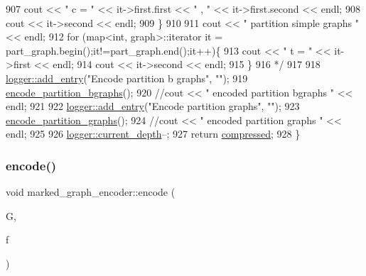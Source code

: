 \begin{DoxyCode}
907 \textcolor{comment}{    cout << " c = " << it->first.first << " , " << it->first.second << endl;}
908 \textcolor{comment}{    cout << it->second << endl;}
909 \textcolor{comment}{  \}}
910 \textcolor{comment}{}
911 \textcolor{comment}{  cout << " partition simple graphs " << endl;}
912 \textcolor{comment}{  for (map<int, graph>::iterator it = part\_graph.begin();it!=part\_graph.end();it++)\{}
913 \textcolor{comment}{    cout << " t = " << it->first << endl;}
914 \textcolor{comment}{    cout << it->second << endl;}
915 \textcolor{comment}{  \}}
916 \textcolor{comment}{  */}
917 
918   \hyperlink{classlogger_a710163deb17bc81f70d53d285b8ac9ac}{logger::add\_entry}(\textcolor{stringliteral}{"Encode partition b graphs"}, \textcolor{stringliteral}{""});
919   \hyperlink{classmarked__graph__encoder_aa113c4870e3221faa332b2151b63d9e6}{encode\_partition\_bgraphs}();
920   \textcolor{comment}{//cout << " encoded partition bgraphs " << endl;}
921 
922   \hyperlink{classlogger_a710163deb17bc81f70d53d285b8ac9ac}{logger::add\_entry}(\textcolor{stringliteral}{"Encode partition graphs"}, \textcolor{stringliteral}{""});
923   \hyperlink{classmarked__graph__encoder_a654463d4b256b84225f5944b5e361ebf}{encode\_partition\_graphs}();
924   \textcolor{comment}{//cout << " encoded partition graphs " << endl;}
925   
926   \hyperlink{classlogger_a9d29b49bd318a719a8e85b59eac54fe0}{logger::current\_depth}--;
927   \textcolor{keywordflow}{return} \hyperlink{classmarked__graph__encoder_ac2ded200860fdd2321f86dd76b28bcb3}{compressed};
928 \}
\end{DoxyCode}
\mbox{\label{classmarked__graph__encoder_a75b32c3c4557bec3322df60ac476fdc9}} 
\subsubsection{\texorpdfstring{encode()}{encode()}\hspace{0.1cm}{\footnotesize\ttfamily [2/2]}}
{\footnotesize\ttfamily void marked\+\_\+graph\+\_\+encoder\+::encode (\begin{DoxyParamCaption}\item[{const \hyperlink{classmarked__graph}{marked\+\_\+graph} \&}]{G,  }\item[{F\+I\+LE $\ast$}]{f }\end{DoxyParamCaption})}




